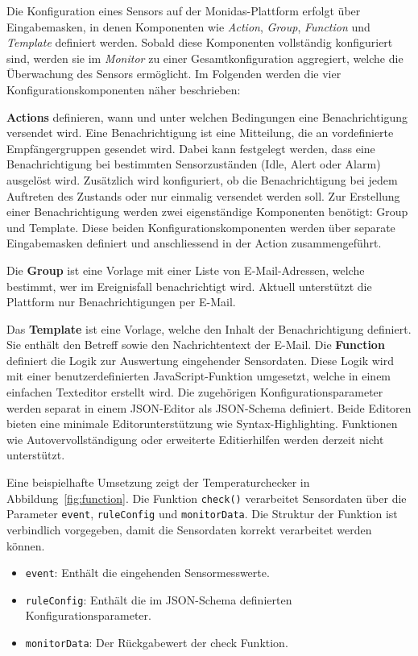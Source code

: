 Die Konfiguration eines Sensors auf der Monidas-Plattform erfolgt über Eingabemasken, in denen Komponenten wie \textit{Action}, \textit{Group}, \textit{Function} und \textit{Template} definiert werden. Sobald diese Komponenten vollständig konfiguriert sind, werden sie im \textit{Monitor} zu einer Gesamtkonfiguration  aggregiert, welche die Überwachung des Sensors ermöglicht. Im Folgenden werden die vier Konfigurationskomponenten näher beschrieben:

\textbf{Actions} definieren, wann und unter welchen Bedingungen eine Benachrichtigung versendet wird. Eine Benachrichtigung ist eine Mitteilung, die an vordefinierte Empfängergruppen gesendet wird. Dabei kann festgelegt werden, dass eine Benachrichtigung bei bestimmten Sensorzuständen (Idle, Alert oder Alarm) ausgelöst wird. Zusätzlich wird konfiguriert, ob die Benachrichtigung bei jedem Auftreten des Zustands oder nur einmalig versendet werden soll. 
Zur Erstellung einer Benachrichtigung werden zwei eigenständige Komponenten benötigt: Group und Template. Diese beiden Konfigurationskomponenten werden über separate Eingabemasken definiert und anschliessend in der Action zusammengeführt.

Die \textbf{Group} ist eine Vorlage mit einer Liste von E-Mail-Adressen, welche bestimmt, wer im Ereignisfall benachrichtigt wird. Aktuell unterstützt die Plattform nur Benachrichtigungen per E-Mail.

Das \textbf{Template} ist eine Vorlage, welche den Inhalt der Benachrichtigung definiert. Sie enthält den Betreff sowie den Nachrichtentext der E-Mail.
\newpage
Die \textbf{Function} definiert die Logik zur Auswertung eingehender Sensordaten. Diese Logik wird mit einer benutzerdefinierten JavaScript-Funktion umgesetzt, welche in einem einfachen Texteditor erstellt wird. Die zugehörigen Konfigurationsparameter werden separat in einem JSON-Editor als JSON-Schema definiert. Beide Editoren bieten eine minimale Editorunterstützung wie Syntax-Highlighting. Funktionen wie Autovervollständigung oder erweiterte Editierhilfen werden derzeit nicht unterstützt.

Eine beispielhafte Umsetzung zeigt der Temperaturchecker in Abbildung~\ref{fig:function}. Die Funktion \texttt{check()} verarbeitet Sensordaten über die Parameter \texttt{event}, \texttt{ruleConfig} und \texttt{monitorData}. Die Struktur der Funktion ist verbindlich vorgegeben, damit die Sensordaten korrekt verarbeitet werden können.

\begin{itemize}
\item \texttt{event}: Enthält die eingehenden Sensormesswerte.
\item \texttt{ruleConfig}: Enthält die im JSON-Schema definierten Konfigurationsparameter.
\item \texttt{monitorData}: Der Rückgabewert der check Funktion.
\end{itemize}

